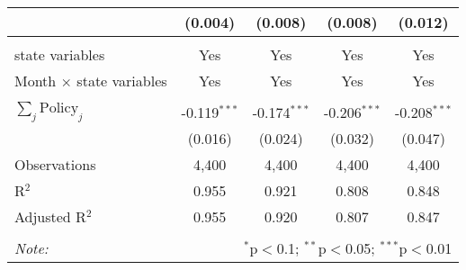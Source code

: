 \begin{tabular}{@{\extracolsep{1pt}}lcccc}
  & (0.004) & (0.008) & (0.008) & (0.012) \\ 
 \hline \\[-1.8ex] 
state variables & Yes & Yes & Yes & Yes \\ 
Month $\times$ state variables & Yes & Yes & Yes & Yes \\ 
\hline \\[-1.8ex] 
$\sum_j \mathrm{Policy}_j$ & -0.119$^{***}$ & -0.174$^{***}$ & -0.206$^{***}$ & -0.208$^{***}$ \\ 
 & (0.016) & (0.024) & (0.032) & (0.047) \\ 
Observations & 4,400 & 4,400 & 4,400 & 4,400 \\ 
R$^{2}$ & 0.955 & 0.921 & 0.808 & 0.848 \\ 
Adjusted R$^{2}$ & 0.955 & 0.920 & 0.807 & 0.847 \\ 
\hline 
\hline \\[-1.8ex] 
\textit{Note:}  & \multicolumn{4}{r}{$^{*}$p$<$0.1; $^{**}$p$<$0.05; $^{***}$p$<$0.01} \\ 
\end{tabular} 